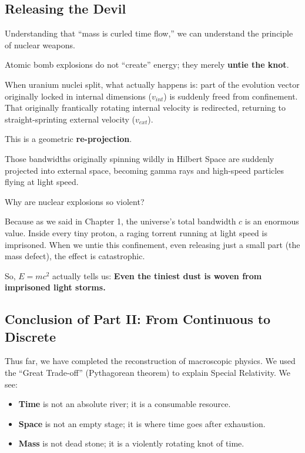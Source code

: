 \subsection{Releasing the Devil}

Understanding that ``mass is curled time flow,'' we can understand the principle of nuclear weapons.

Atomic bomb explosions do not ``create'' energy; they merely \textbf{untie the knot}.

When uranium nuclei split, what actually happens is: part of the evolution vector originally locked in internal dimensions ($v_{int}$) is suddenly freed from confinement. That originally frantically rotating internal velocity is redirected, returning to straight-sprinting external velocity ($v_{ext}$).

This is a geometric \textbf{re-projection}.

Those bandwidths originally spinning wildly in Hilbert Space are suddenly projected into external space, becoming gamma rays and high-speed particles flying at light speed.

Why are nuclear explosions so violent?

Because as we said in Chapter 1, the universe's total bandwidth $c$ is an enormous value. Inside every tiny proton, a raging torrent running at light speed is imprisoned. When we untie this confinement, even releasing just a small part (the mass defect), the effect is catastrophic.

So, $E=mc^2$ actually tells us: \textbf{Even the tiniest dust is woven from imprisoned light storms.}

\subsection{Conclusion of Part II: From Continuous to Discrete}

Thus far, we have completed the reconstruction of macroscopic physics. We used the ``Great Trade-off'' (Pythagorean theorem) to explain Special Relativity. We see:

\begin{itemize}
\item \textbf{Time} is not an absolute river; it is a consumable resource.

\item \textbf{Space} is not an empty stage; it is where time goes after exhaustion.

\item \textbf{Mass} is not dead stone; it is a violently rotating knot of time.
\end{itemize}

